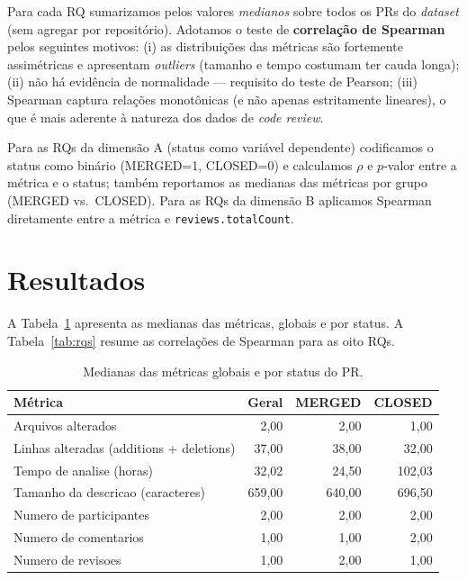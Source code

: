 \documentclass[11pt,a4paper]{article}
\begin{document}
Para cada RQ sumarizamos pelos valores \emph{medianos} sobre todos os PRs do \emph{dataset}
(sem agregar por reposit\'orio). Adotamos o teste de \textbf{correla\c{c}\~ao de Spearman} pelos
seguintes motivos:
(i) as distribui\c{c}\~oes das m\'etricas s\~ao fortemente assim\'etricas e apresentam
\emph{outliers} (tamanho e tempo costumam ter cauda longa);
(ii) n\~ao h\'a evid\^encia de normalidade --- requisito do teste de Pearson;
(iii) Spearman captura rela\c{c}\~oes monot\^onicas (e n\~ao apenas estritamente lineares),
o que \'e mais aderente \`a natureza dos dados de \emph{code review}.

Para as RQs da dimens\~ao A (status como vari\'avel dependente) codificamos o status como
bin\'ario (MERGED=1, CLOSED=0) e calculamos $\rho$ e $p$-valor entre a m\'etrica e o
status; tamb\'em reportamos as medianas das m\'etricas por grupo (MERGED vs.\ CLOSED).
Para as RQs da dimens\~ao B aplicamos Spearman diretamente entre a m\'etrica e
\texttt{reviews.totalCount}.

\section{Resultados}

A Tabela~\ref{tab:medianas} apresenta as medianas das m\'etricas, globais e por status.
A Tabela~\ref{tab:rqs} resume as correla\c{c}\~oes de Spearman para as oito RQs.

\begin{table}[H]
\centering
\caption{Medianas das m\'etricas globais e por status do PR.}
\label{tab:medianas}
\begin{tabular}{lrrr}
\toprule
M\'etrica & Geral & MERGED & CLOSED \\
\midrule
Arquivos alterados & 2,00 & 2,00 & 1,00 \\
Linhas alteradas (additions + deletions) & 37,00 & 38,00 & 32,00 \\
Tempo de analise (horas) & 32,02 & 24,50 & 102,03 \\
Tamanho da descricao (caracteres) & 659,00 & 640,00 & 696,50 \\
Numero de participantes & 2,00 & 2,00 & 2,00 \\
Numero de comentarios & 1,00 & 1,00 & 2,00 \\
Numero de revisoes & 1,00 & 2,00 & 1,00 \\
\bottomrule
\end{tabular}
\end{table}
\end{document}
